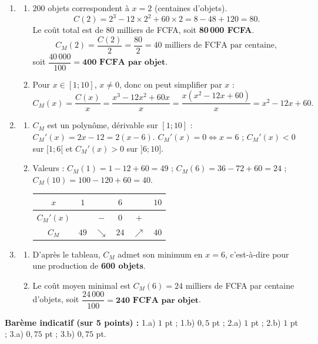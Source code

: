 \documentclass[11pt]{article}
\begin{document}
\begin{corrige}
\begin{enumerate}
\item \begin{enumerate}
\item $200$ objets correspondent à $x=2$ (centaines d'objets).
\[ C(2)=2^3-12\times 2^2+60\times 2 = 8-48+120 = 80. \]
Le coût total est de $80$ milliers de FCFA, soit \textbf{80\,000 FCFA}.
\[ C_M(2)=\frac{C(2)}{2}=\frac{80}{2}=40 \text{ milliers de FCFA par centaine}, \]
soit $\dfrac{40\,000}{100}=\textbf{400 FCFA par objet}$.
\item Pour $x\in[1;10]$, $x\neq 0$, donc on peut simplifier par $x$ :
\[ C_M(x)=\frac{C(x)}{x}=\frac{x^3-12x^2+60x}{x}=\frac{x(x^2-12x+60)}{x}=x^2-12x+60. \]
\end{enumerate}
\item \begin{enumerate}
\item $C_M$ est un polynôme, dérivable sur $[1;10]$ : $C_M'(x)=2x-12=2(x-6)$.
$C_M'(x)=0 \iff x=6$ ; $C_M'(x)<0$ sur $[1;6[$ et $C_M'(x)>0$ sur $]6;10]$.
\item Valeurs : $C_M(1)=1-12+60=49$ ; $C_M(6)=36-72+60=24$ ; $C_M(10)=100-120+60=40$.
\begin{center}
\begin{tabular}{|c|ccccc|}
\hline
$x$ & $1$ & & $6$ & & $10$ \\
\hline
$C_M'(x)$ & & $-$ & $0$ & $+$ & \\
\hline
$C_M$ & $49$ & $\searrow$ & $24$ & $\nearrow$ & $40$ \\
\hline
\end{tabular}
\end{center}
\end{enumerate}
\item \begin{enumerate}
\item D'après le tableau, $C_M$ admet son minimum en $x=6$, c'est-à-dire pour une production de \textbf{600 objets}.
\item Le coût moyen minimal est $C_M(6)=24$ milliers de FCFA par centaine d'objets, soit $\dfrac{24\,000}{100}=\textbf{240 FCFA par objet}$.
\end{enumerate}
\end{enumerate}
\textbf{Barème indicatif (sur 5 points) :} 1.a) $1$ pt ; 1.b) $0,5$ pt ; 2.a) $1$ pt ; 2.b) $1$ pt ; 3.a) $0,75$ pt ; 3.b) $0,75$ pt.


\end{corrige}
\end{document}
